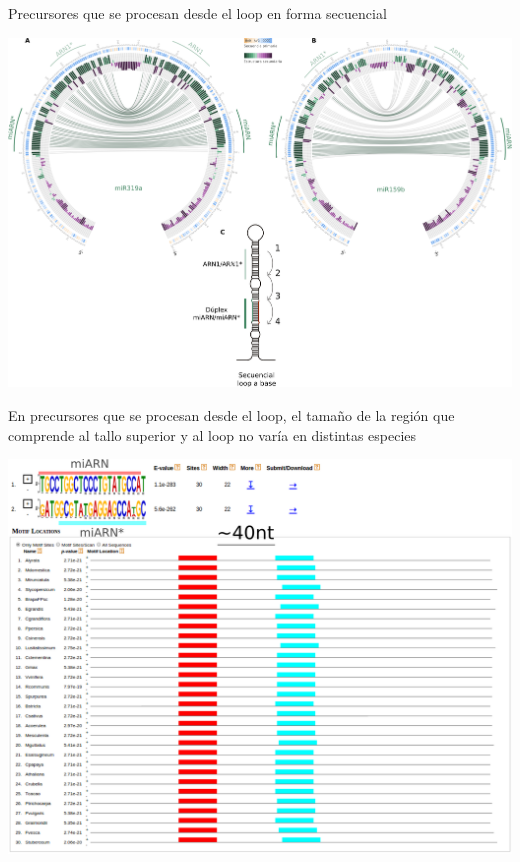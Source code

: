 \documentclass{beamer}
\begin{document}
\begin{frame}{Precursores que se procesan desde el loop en forma secuencial}
	\begin{center}
		\includegraphics[width=1\textwidth]{img/seqLTB_circos_defensa.png}
	\end{center}
\end{frame}

\begin{frame}{En precursores que se procesan desde el loop, el tamaño de la región que comprende al tallo superior y al loop no varía en distintas especies}

	\begin{center}
		\includegraphics[width=.8\textwidth]{img/miR160a_meme.png}
	\end{center}
\end{frame}
\end{document}
